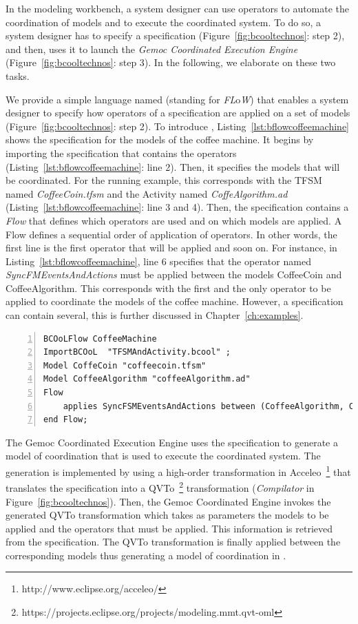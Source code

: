 In the modeling workbench, a system designer can use \bcool operators to automate the coordination of models and to execute the coordinated system. To do so, a system designer has to specify a \bflow specification (Figure~\ref{fig:bcooltechnos}: step 2), and then, uses it to launch the \emph{Gemoc Coordinated Execution Engine} (Figure~\ref{fig:bcooltechnos}: step 3). In the following, we elaborate on these two tasks.  

We provide a simple language named \bflow (standing for \bcool \emph{FL}o\emph{W}) that enables a system designer to specify how operators of a \bcool specification are applied on a set of models (Figure~\ref{fig:bcooltechnos}: step 2). To introduce \bflow, Listing~\ref{lst:bflowcoffeemachine} shows the specification for the models of the coffee machine. It begins by importing the \bcool specification that contains the operators (Listing~\ref{lst:bflowcoffeemachine}: line 2). Then, it specifies the models that will be coordinated. For the running example, this corresponds with the TFSM named \emph{CoffeeCoin.tfsm} and the Activity named \emph{CoffeAlgorithm.ad} (Listing~\ref{lst:bflowcoffeemachine}: line 3 and 4). Then, the specification contains a \emph{Flow} that defines which operators are used and on which models are applied. A Flow defines a sequential order of application of operators. In other words, the first line is the first operator that will be applied and soon on. For instance, in Listing~\ref{lst:bflowcoffeemachine}, line 6 specifies that the operator named \emph{SyncFMEventsAndActions} must be applied between the models CoffeeCoin and CoffeeAlgorithm. This corresponds with the first and the only operator to be applied to coordinate the models of the coffee machine. However, a \bflow specification can contain several, this is further discussed in Chapter~\ref{ch:examples}.  

\begin{lstlisting}[language=bflow,
caption={\bflow specification for the models of the coffee machine},
label={lst:bflowcoffeemachine}, 
basicstyle=\scriptsize\ttfamily, backgroundcolor=\color{LGrey}, numbers=left, xleftmargin=2pt]
BCOoLFlow CoffeeMachine
ImportBCOoL  "TFSMAndActivity.bcool" ;
Model CoffeCoin "coffeecoin.tfsm"
Model CoffeeAlgorithm "coffeeAlgorithm.ad"
Flow 
	applies SyncFSMEventsAndActions between (CoffeeAlgorithm, CoffeCoin);
end Flow;
\end{lstlisting}


The Gemoc Coordinated Execution Engine uses the \bflow specification to generate a model of coordination that is used to execute the coordinated system. The generation is implemented by using a high-order transformation in Acceleo~\footnote{http://www.eclipse.org/acceleo/} that translates the \bcool specification into a QVTo~\footnote{https://projects.eclipse.org/projects/modeling.mmt.qvt-oml} transformation (\emph{Compilator} in Figure~\ref{fig:bcooltechnos}). Then, the Gemoc Coordinated Engine invokes the generated QVTo transformation which takes as parameters the models to be applied and the operators that must be applied. This information is retrieved from the \bflow specification. The QVTo transformation is finally applied between the corresponding models thus generating a model of coordination in \ccsl. 

